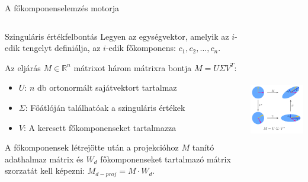 \documentclass[english, aspectratio=169]{beamer}
\begin{document}
\begin{frame}{A főkomponenselemzés motorja}
\begin{columns}
\begin{column}{.6\textwidth}
\begin{block}{Szinguláris értékfelbontás}
Legyen az egységvektor, amelyik az $i$-edik tengelyt definiálja, az $i$-edik főkomponens: $c_1, c_2, \ldots, c_n$.\par\smallskip
Az eljárás $M\in \mathbb{R}^n$ mátrixot három mátrixra bontja $M = U \Sigma V^T$:
\begin{itemize}
	\item $U$: $n$ db ortonormált sajátvektort tartalmaz
	\item $\Sigma$: Főátlóján találhatóak a szinguláris értékek
	\item $V$: A keresett főkomponenseket tartalmazza
\end{itemize}
A főkomponensek létrejötte után a projekcióhoz $M$ tanító adathalmaz mátrix és $W_d$ főkomponenseket tartalmazó mátrix szorzatát kell képezni: $M_{d-proj} = M \cdot W_d$.
\end{block}
\end{column}
\begin{column}{.4\textwidth}
\begin{center}
\includegraphics[width=6cm, height=7cm, keepaspectratio]{images/unsupervised_13.png}
\end{center}
\end{column}
\end{columns}
\end{frame}
\end{document}
